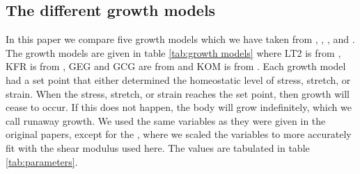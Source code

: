 \subsection{The different growth models}
\label{sub:different models} 
In this paper we compare five growth models which we have taken from \citep{Taber1998}, \citep{Kroon2009}, \citep{Goktepe}, and \citep{Kerckhoffs2012}. The growth models are given in table \ref{tab:growth models} where LT2 is from \citep{Taber1998}, KFR is from \citep{Kroon2009}, GEG and GCG are from \citep{Goktepe} and KOM is from \citep{Kerckhoffs2012}. Each growth model had a set point that either determined the homeostatic level of stress, stretch, or strain. When the stress, stretch, or strain reaches the set point, then growth will cease to occur. If this does not happen, the body will grow indefinitely, which we call runaway growth. We used the same variables as they were given in the original papers, except for the , where we scaled the variables to more accurately fit with the shear modulus used here. The values are tabulated in table \ref{tab:parameters}.
